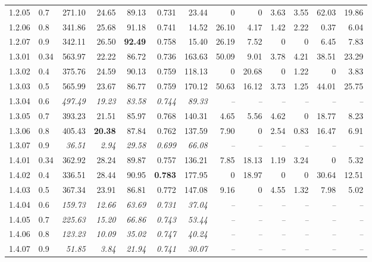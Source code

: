 \begin{table}[!t]
\begin{tabular}{@{}llrrrrrrrrrrr@{}}
    1.2.05 & 0.7 & 271.10 & 24.65 & 89.13 & 0.731 & 23.44 & 0 & 0 & 3.63 & 3.55 & 62.03 & 19.86 \\
    1.2.06 & 0.8 & 341.86 & 25.68 & 91.18 & 0.741 & 14.52 & 26.10 & 4.17 & 1.42 & 2.22 & 0.37 & 6.04 \\
    1.2.07 & 0.9 & 342.11 & 26.50 & \textbf{92.49} & 0.758 & 15.40 & 26.19 & 7.52 & 0 & 0 & 6.45 & 7.83 \\
    1.3.01 & 0.34 & 563.97 & 22.22 & 86.72 & 0.736 & 163.63 & 50.09 & 9.01 & 3.78 & 4.21 & 38.51 & 23.29 \\
    1.3.02 & 0.4 & 375.76 & 24.59 & 90.13 & 0.759 & 118.13 & 0 & 20.68 & 0 & 1.22 & 0 & 3.83 \\
    1.3.03 & 0.5 & 565.99 & 23.67 & 86.77 & 0.759 & 170.12 & 50.63 & 16.12 & 3.73 & 1.25 & 44.01 & 25.75 \\
    1.3.04 & 0.6 & \textit{497.49} & \textit{19.23} & \textit{83.58} & \textit{0.744} & \textit{89.33} & \textit{--} & \textit{--} & \textit{--} & \textit{--} & \textit{--} & \textit{--} \\
    1.3.05 & 0.7 & 393.23 & 21.51 & 85.97 & 0.768 & 140.31 & 4.65 & 5.56 & 4.62 & 0 & 18.77 & 8.23 \\
    1.3.06 & 0.8 & 405.43 & \textbf{20.38} & 87.84 & 0.762 & 137.59 & 7.90 & 0 & 2.54 & 0.83 & 16.47 & 6.91 \\
    1.3.07 & 0.9 & \textit{36.51} & \textit{2.94} & \textit{29.58} & \textit{0.699} & \textit{66.08} & \textit{--} & \textit{--} & \textit{--} & \textit{--} & \textit{--} & \textit{--} \\
    1.4.01 & 0.34 & 362.92 & 28.24 & 89.87 & 0.757 & 136.21 & 7.85 & 18.13 & 1.19 & 3.24 & 0 & 5.32 \\
    1.4.02 & 0.4 & 336.51 & 28.44 & 90.95 & \textbf{0.783} & 177.95 & 0 & 18.97 & 0 & 0 & 30.64 & 12.51 \\
    1.4.03 & 0.5 & 367.34 & 23.91 & 86.81 & 0.772 & 147.08 & 9.16 & 0 & 4.55 & 1.32 & 7.98 & 5.02 \\
    1.4.04 & 0.6 & \textit{159.73} & \textit{12.66} & \textit{63.69} & \textit{0.731} & \textit{37.04} & \textit{--} & \textit{--} & \textit{--} & \textit{--} & \textit{--} & \textit{--} \\
    1.4.05 & 0.7 & \textit{225.63} & \textit{15.20} & \textit{66.86} & \textit{0.743} & \textit{53.44} & \textit{--} & \textit{--} & \textit{--} & \textit{--} & \textit{--} & \textit{--} \\
    1.4.06 & 0.8 & \textit{123.23} & \textit{10.09} & \textit{35.02} & \textit{0.747} & \textit{40.24} & \textit{--} & \textit{--} & \textit{--} & \textit{--} & \textit{--} & \textit{--} \\
    1.4.07 & 0.9 & \textit{51.85} & \textit{3.84} & \textit{21.94} & \textit{0.741} & \textit{30.07} & \textit{--} & \textit{--} & \textit{--} & \textit{--} & \textit{--} & \textit{--} \\
\hline
\end{tabular}
\end{table}